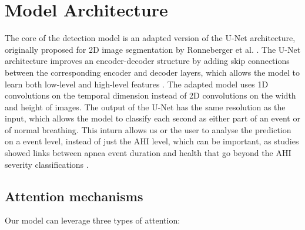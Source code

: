 \section{Model Architecture}

The core of the detection model is an adapted version of the U-Net architecture, originally proposed for 2D image segmentation by Ronneberger et al. \cite{ronneberger2015u}. The U-Net architecture improves an encoder-decoder structure by adding skip connections between the corresponding encoder and decoder layers, which allows the model to learn both low-level and high-level features . The adapted model uses 1D convolutions on the temporal dimension instead of 2D convolutions on the width and height of images. The output of the U-Net has the same resolution as the input, which allows the model to classify each second as either part of an event or of normal breathing. This inturn allows us or the user to analyse the prediction on a event level, instead of just the AHI level, which can be important, as studies showed links between apnea event duration and health that go beyond the AHI severity classifications \cite{butler2019apnea}.

\subsection*{Attention mechanisms}

Our model can leverage three types of attention:


